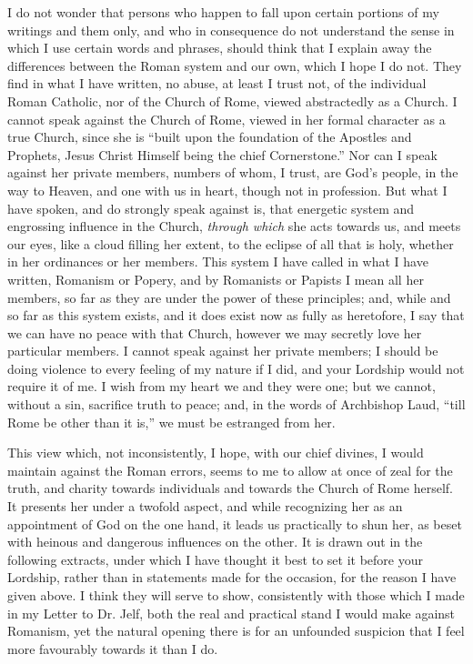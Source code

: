 I do not wonder that persons who happen to fall
upon certain portions of my writings and them only, and who in
consequence do not understand the sense in which I use certain words
and phrases, should think that I explain away the differences between
the Roman system and our own, which I hope I do not. They find in what
I have written, no abuse, at least I trust not, of the individual
Roman Catholic, nor of the Church of Rome, viewed abstractedly as a
Church. I cannot speak against the Church of Rome, viewed in her
formal character as a true Church, since she is ``built upon the
foundation of the Apostles and Prophets, Jesus Christ Himself being
the chief Cornerstone.'' Nor can I speak against her private members,
numbers of whom, I trust, are God's people, in the way to Heaven, and
one with us in heart, though not in profession. But what I have
spoken, and do strongly speak against is, that energetic system and
engrossing influence in the Church, \emph{through which} she acts
towards us, and meets our eyes, like a cloud filling her extent, to
the eclipse of all that is holy, whether in her ordinances or her
members. This system I have called in what I have written, Romanism or
Popery, and by Romanists or Papists I mean all her members, so far as
they are under the power of these principles; and, while and so far as
this system exists, and it does exist now as fully as heretofore, I
say that we can have no peace with that Church, however we may
secretly love her particular members. I cannot speak against her
private members; I should be doing violence to every feeling of my
nature if I did, and your Lordship would not require it of me. I wish
from my heart we and they were one; but we cannot, without a sin,
sacrifice truth to peace; and, in the words of Archbishop Laud, ``till
Rome be other than it is,'' we must be estranged from her.

This view which, not inconsistently, I hope, with
our chief divines, I would maintain against the Roman errors,
seems to me to allow at once of zeal for the truth, and charity
towards individuals and towards the Church of Rome herself. It
presents her under a twofold aspect, and while recognizing her as an
appointment of God on the one hand, it leads us practically to shun
her, as beset with heinous and dangerous influences on the other. It
is drawn out in the following extracts, under which I have thought it
best to set it before your Lordship, rather than in statements made
for the occasion, for the reason I have given above. I think they will
serve to show, consistently with those which I made in my Letter to
Dr. Jelf, both the real and practical stand I would make against
Romanism, yet the natural opening there is for an unfounded suspicion
that I feel more favourably towards it than I do.

